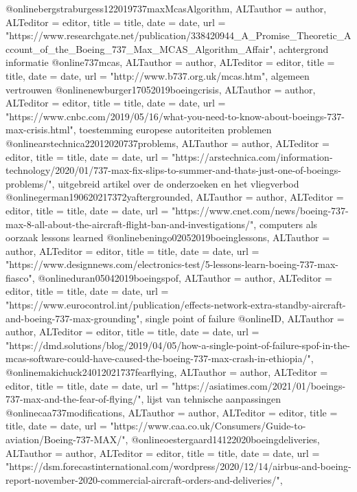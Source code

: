 {{{{{{{{{@online{bergstraburgess122019737maxMcasAlgorithm,	ALTauthor = {author},	ALTeditor = {editor},	title = {title},	date = {date},	url = {"https://www.researchgate.net/publication/338420944_A_Promise_Theoretic_Account_of_the_Boeing_737_Max_MCAS_Algorithm_Affair"},}
achtergrond informatie
@online{737mcas,	ALTauthor = {author},	ALTeditor = {editor},	title = {title},	date = {date},	url = {"http://www.b737.org.uk/mcas.htm"},}
algemeen vertrouwen
@online{newburger17052019boeingcrisis,	ALTauthor = {author},	ALTeditor = {editor},	title = {title},	date = {date},	url = {"https://www.cnbc.com/2019/05/16/what-you-need-to-know-about-boeings-737-max-crisis.html"},}
toestemming europese autoriteiten
problemen
@online{arstechnica22012020737problems,	ALTauthor = {author},	ALTeditor = {editor},	title = {title},	date = {date},	url = {"https://arstechnica.com/information-technology/2020/01/737-max-fix-slips-to-summer-and-thats-just-one-of-boeings-problems/"},}
uitgebreid artikel over de onderzoeken en het vliegverbod
@online{german190620217372yaftergrounded,	ALTauthor = {author},	ALTeditor = {editor},	title = {title},	date = {date},	url = {"https://www.cnet.com/news/boeing-737-max-8-all-about-the-aircraft-flight-ban-and-investigations/"},}
computers als oorzaak
lessons learned
@online{beningo02052019boeinglessons,	ALTauthor = {author},	ALTeditor = {editor},	title = {title},	date = {date},	url = {"https://www.designnews.com/electronics-test/5-lessons-learn-boeing-737-max-fiasco"},}
@online{duran05042019boeingspof,	ALTauthor = {author},	ALTeditor = {editor},	title = {title},	date = {date},	url = {"https://www.eurocontrol.int/publication/effects-network-extra-standby-aircraft-and-boeing-737-max-grounding"},}
single point of failure
@online{ID,	ALTauthor = {author},	ALTeditor = {editor},	title = {title},	date = {date},	url = {"https://dmd.solutions/blog/2019/04/05/how-a-single-point-of-failure-spof-in-the-mcas-software-could-have-caused-the-boeing-737-max-crash-in-ethiopia/"},}
@online{makichuck24012021737fearflying,	ALTauthor = {author},	ALTeditor = {editor},	title = {title},	date = {date},	url = {"https://asiatimes.com/2021/01/boeings-737-max-and-the-fear-of-flying/"},}
lijst van tehnische aanpassingen
@online{caa737modifications,	ALTauthor = {author},	ALTeditor = {editor},	title = {title},	date = {date},	url = {"https://www.caa.co.uk/Consumers/Guide-to-aviation/Boeing-737-MAX/"},}
@online{oestergaard14122020boeingdeliveries,	ALTauthor = {author},	ALTeditor = {editor},	title = {title},	date = {date},	url = {"https://dsm.forecastinternational.com/wordpress/2020/12/14/airbus-and-boeing-report-november-2020-commercial-aircraft-orders-and-deliveries/"},}
}}}}}}}}}
